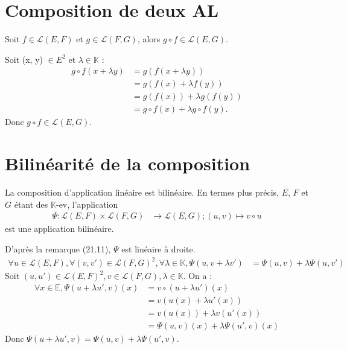 \documentclass[../main.tex]{subfiles}
\begin{document}
\section{Composition de deux AL}
\begin{tcolorbox}[title=Propostion 21.10, title filled=false, colframe=lightblue, colback=lightblue!10!white]
    Soit $f \in \mathcal{L}(E, F)$ et $g \in \mathcal{L}(F, G)$, alors $g \circ f \in \mathcal{L}(E, G)$.
\end{tcolorbox}

\noindent Soit (x, y) $\in E^2$ et $\lambda \in \mathbb{K}$ : 
\begin{align*}
    g \circ f(x + \lambda y) &= g(f(x + \lambda y)) \\
    &= g(f(x) + \lambda f(y)) \\
    &= g(f(x)) + \lambda g(f(y)) \\
    &= g \circ f(x) + \lambda g \circ f(y).
\end{align*}
Donc $g \circ f \in \mathcal{L}(E, G)$.

\section{Bilinéarité de la composition}
\begin{tcolorbox}[title=Propostion 21.13, title filled=false, colframe=lightblue, colback=lightblue!10!white]
    La composition d'application linéaire est bilinéaire. En termes plus précis, $E$, $F$ et $G$ étant des $\mathbb{K}$-ev, l'application
    \begin{align*}
        \Psi : \mathcal{L}(E, F) \times \mathcal{L}(F, G) &\longrightarrow \mathcal{L}(E, G); (u, v) \mapsto v \circ u
    \end{align*}
    est une application bilinéaire. 
\end{tcolorbox}

\noindent D'après la remarque (21.11), $\Psi$ est linéaire à droite. \\
\begin{align*}
    \forall u \in \mathcal{L}(E, F), \forall (v, v') \in \mathcal{L}(F, G)^2, \forall \lambda \in \mathbb{K}, \Psi(u, v + \lambda v') &= \Psi(u, v) + \lambda \Psi(u, v')
\end{align*}
Soit $(u, u') \in \mathcal{L}(E, F)^2, v \in \mathcal{L}(F, G), \lambda \in \mathbb{K}$. On a :
\begin{align*}
    \forall x \in \mathbb{E}, \Psi(u + \lambda u', v)(x) &= v \circ (u + \lambda u')(x) \\
    &= v(u(x) + \lambda u'(x)) \\
    &= v(u(x)) + \lambda v(u'(x)) \\
    &= \Psi(u, v)(x) + \lambda \Psi(u', v)(x)
\end{align*}
Donc $\Psi(u + \lambda u', v) = \Psi(u, v) + \lambda \Psi(u', v)$. \\
\end{document}
